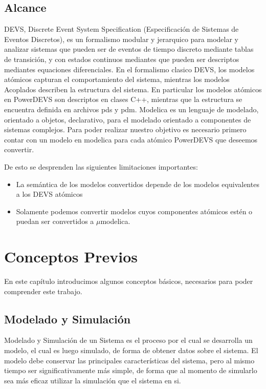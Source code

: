 \documentclass[a4paper,	11pt]{report}
\begin{document}
\section{Alcance}
DEVS, Discrete Event System Specification (Especificación de Sistemas de Eventos Discretos), es un formalismo modular y jerarquico para modelar y analizar sistemas que pueden ser de eventos de tiempo discreto mediante tablas de transición, y con estados continuos mediantes que pueden ser descriptos mediantes equaciones diferenciales.
En el formalismo clasico DEVS, los modelos atómicos capturan el comportamiento del sistema, mientras los modelos Acoplados describen la estructura del sistema.
En particular los modelos atómicos en PowerDEVS son descriptos en clases C++, mientras que la estructura se encuentra definida en archivos pds y pdm.
Modelica es un lenguaje de modelado, orientado a objetos, declarativo, para el modelado orientado a componentes de sistemas complejos.
Para poder realizar nuestro objetivo es necesario primero contar con un modelo  en modelica para cada atómico PowerDEVS que deseemos convertir. 

De esto se desprenden las siguientes limitaciones importantes:
\begin{itemize}
	\item La semántica de los modelos convertidos depende de los modelos equivalentes a los DEVS atómicos 
	\item Solamente podemos convertir modelos cuyos componentes atómicos estén o puedan ser convertidos a $\mu$modelica.
\end{itemize}
	
\chapter{Conceptos Previos}
En este capítulo introducimos algunos conceptos básicos, necesarios para poder comprender este trabajo.
\section{Modelado y Simulación}

Modelado y Simulación de un Sistema es el proceso por el cual se desarrolla un modelo, el cual es luego simulado, de forma de obtener datos sobre el sistema. El modelo debe conservar las principales características del sistema, pero al mismo tiempo ser significativamente más simple, de forma que al momento de simularlo sea más eficaz utilizar la simulación que el sistema en si.
\end{document}
